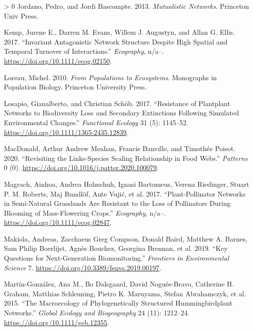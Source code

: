 \documentclass[10pt,oneside]{article}
\newlength{\cslhangindent}
\newenvironment{CSLReferences}[3] %
 {%
  \setlength{\parindent}{0pt}
  \ifodd #1 \everypar{\setlength{\hangindent}{\cslhangindent}}\ignorespaces\fi
  \ifnum #2 > 0
  \setlength{\parskip}{#2\baselineskip}
  \fi
 }%
 {}
\begin{document}
\begin{CSLReferences}{1}{0}
\leavevmode\hypertarget{ref-Jordano2013MutNet}{}%
Jordano, Pedro, and Jordi Bascompte. 2013. \emph{Mutualistic Networks}.
Princeton Univ Press.

\leavevmode\hypertarget{ref-Kemp2017InvAnt}{}%
Kemp, Jurene E., Darren M. Evans, Willem J. Augustyn, and Allan G.
Ellis. 2017. {``Invariant Antagonistic Network Structure Despite High
Spatial and Temporal Turnover of Interactions.''} \emph{Ecography},
n/a--. \url{https://doi.org/10.1111/ecog.02150}.

\leavevmode\hypertarget{ref-Loreau2010PopEco}{}%
Loreau, Michel. 2010. \emph{From Populations to Ecosystems}. Monographs
in Population Biology. Princeton University Press.

\leavevmode\hypertarget{ref-Losapio2017ResPla}{}%
Losapio, Gianalberto, and Christian Schöb. 2017. {``Resistance of
Plantplant Networks to Biodiversity Loss and Secondary Extinctions
Following Simulated Environmental Changes.''} \emph{Functional Ecology}
31 (5): 1145--52. \url{https://doi.org/10.1111/1365-2435.12839}.

\leavevmode\hypertarget{ref-MacDonald2020RevLin}{}%
MacDonald, Arthur Andrew Meahan, Francis Banville, and Timothée Poisot.
2020. {``Revisiting the Links-Species Scaling Relationship in Food
Webs.''} \emph{Patterns} 0 (0).
\url{https://doi.org/10.1016/j.patter.2020.100079}.

\leavevmode\hypertarget{ref-Magrach2017PlaNet}{}%
Magrach, Ainhoa, Andrea Holzschuh, Ignasi Bartomeus, Verena Riedinger,
Stuart P. M. Roberts, Maj Rundlöf, Ante Vujić, et al. 2017.
{``Plant-Pollinator Networks in Semi-Natural Grasslands Are Resistant to
the Loss of Pollinators During Blooming of Mass-Flowering Crops.''}
\emph{Ecography}, n/a--. \url{https://doi.org/10.1111/ecog.02847}.

\leavevmode\hypertarget{ref-Makiola2019KeyQue}{}%
Makiola, Andreas, Zacchaeus Greg Compson, Donald Baird, Matthew A.
Barnes, Sam Philip Boerlijst, Agnès Bouchez, Georgina Brennan, et al.
2019. {``Key Questions for Next-Generation Biomonitoring.''}
\emph{Frontiers in Environmental Science} 7.
\url{https://doi.org/10.3389/fenvs.2019.00197}.

\leavevmode\hypertarget{ref-Martin-Gonzalez2015MacPhy}{}%
Martín-González, Ana M., Bo Dalsgaard, David Nogués-Bravo, Catherine H.
Graham, Matthias Schleuning, Pietro K. Maruyama, Stefan Abrahamczyk, et
al. 2015. {``The Macroecology of Phylogenetically Structured
Hummingbirdplant Networks.''} \emph{Global Ecology and Biogeography} 24
(11): 1212--24. \url{https://doi.org/10.1111/geb.12355}.


\end{CSLReferences}
\end{document}
